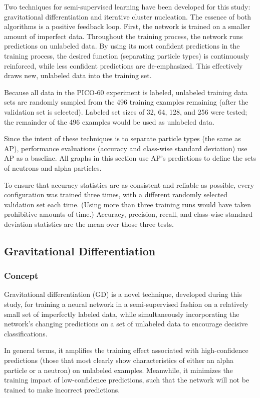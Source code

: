 \documentclass[10pt]{article}
\begin{document}
Two techniques for semi-supervised learning have been developed for this study: gravitational differentiation and iterative cluster nucleation. The essence of both algorithms is a positive feedback loop. First, the network is trained on a smaller amount of imperfect data. Throughout the training process, the network runs predictions on unlabeled data. By using its most confident predictions in the training process, the desired function (separating particle types) is continuously reinforced, while less confident predictions are de-emphasized. This effectively draws new, unlabeled data into the training set.

Because all data in the PICO-60 experiment is labeled, unlabeled training data sets are randomly sampled from the 496 training examples remaining (after the validation set is selected). Labeled set sizes of 32, 64, 128, and 256 were tested; the remainder of the 496 examples would be used as unlabeled data.

Since the intent of these techniques is to separate particle types (the same as AP), performance evaluations (accuracy and class-wise standard deviation) use AP as a baseline. All graphs in this section use AP's predictions to define the sets of neutrons and alpha particles.

To ensure that accuracy statistics are as consistent and reliable as possible, every configuration was trained three times, with a different randomly selected validation set each time. (Using more than three training runs would have taken prohibitive amounts of time.) Accuracy, precision, recall, and class-wise standard deviation statistics are the mean over those three tests.

\subsection{Gravitational Differentiation}

\subsubsection{Concept}

Gravitational differentiation (GD) is a novel technique, developed during this study, for training a neural network in a semi-supervised fashion on a relatively small set of imperfectly labeled data, while simultaneously incorporating the network's changing predictions on a set of unlabeled data to encourage decisive classifications.

In general terms, it amplifies the training effect associated with high-confidence predictions (those that most clearly show characteristics of either an alpha particle or a neutron) on unlabeled examples. Meanwhile, it minimizes the training impact of low-confidence predictions, such that the network will not be trained to make incorrect predictions.
\end{document}
